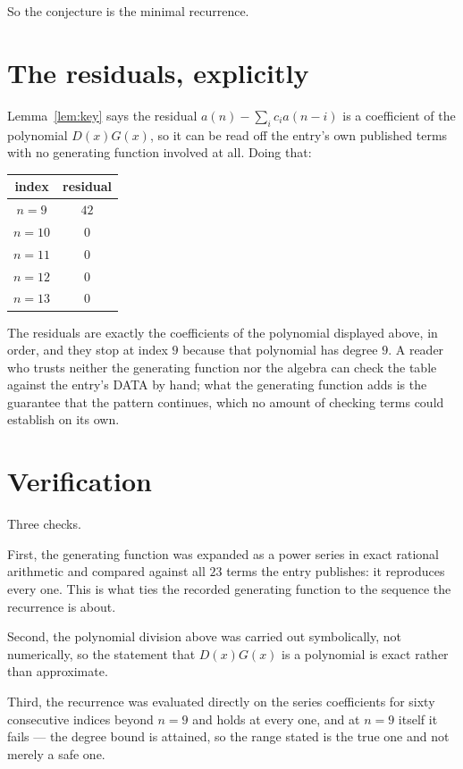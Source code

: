\documentclass[11pt,a4paper]{article}
\theoremstyle{plain}
\theoremstyle{definition}
\begin{document}
So the conjecture is the minimal recurrence.

\section{The residuals, explicitly}

Lemma~\ref{lem:key} says the residual $a(n)-\sum_ic_ia(n-i)$ is a coefficient of the
polynomial $D(x)G(x)$, so it can be read off the entry's own published terms with no
generating function involved at all. Doing that:
\begin{center}
\begin{tabular}{cc}
index & residual \\ \hline
$n=9$ & $42$ \\
$n=10$ & $0$ \\
$n=11$ & $0$ \\
$n=12$ & $0$ \\
$n=13$ & $0$
\end{tabular}
\end{center}
The residuals are exactly the coefficients of the polynomial displayed above, in order, and
they stop at index $9$ because that polynomial has degree $9$. A reader who trusts
neither the generating function nor the algebra can check the table against the entry's DATA
by hand; what the generating function adds is the guarantee that the pattern continues, which
no amount of checking terms could establish on its own.

\section{Verification}

Three checks.

First, the generating function was expanded as a power series in exact rational arithmetic and
compared against all $23$ terms the entry publishes: it reproduces every one. This is
what ties the recorded generating function to the sequence the recurrence is about.

Second, the polynomial division above was carried out symbolically, not numerically, so the
statement that $D(x)G(x)$ is a polynomial is exact rather than approximate.

Third, the recurrence was evaluated directly on the series coefficients for sixty consecutive
indices beyond $n=9$ and holds at every one, and at $n=9$ itself it fails --- the
degree bound is attained, so the range stated is the true one and not merely a safe one.
\end{document}
